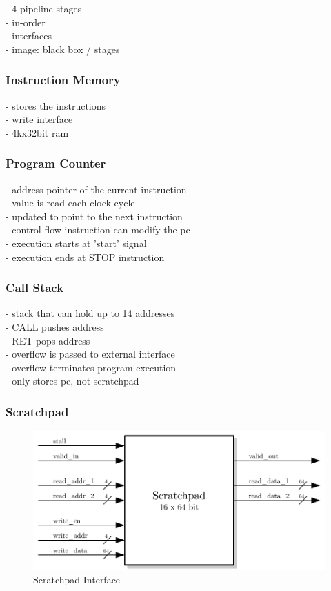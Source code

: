 - 4 pipeline stages\\
- in-order\\
- interfaces\\
- image: black box / stages\\

\subsubsection{Instruction Memory}

- stores the instructions\\
- write interface\\
- 4kx32bit ram\\

\subsubsection{Program Counter}

- address pointer of the current instruction\\
- value is read each clock cycle\\
- updated to point to the next instruction\\
- control flow instruction can modify the pc\\
- execution starts at 'start' signal\\
- execution ends at STOP instruction

\subsubsection{Call Stack}

- stack that can hold up to 14 addresses\\
- CALL pushes address\\
- RET pops address\\
- overflow is passed to external interface\\
- overflow terminates program execution\\
- only stores pc, not scratchpad\\

\subsubsection{Scratchpad}

\begin{figure}[htb]
 \centering
 \includegraphics[scale=1.0]{images/scratchpad_blackbox}
 \caption{Scratchpad Interface}
\label{fig:scp_inf}
\end{figure}


